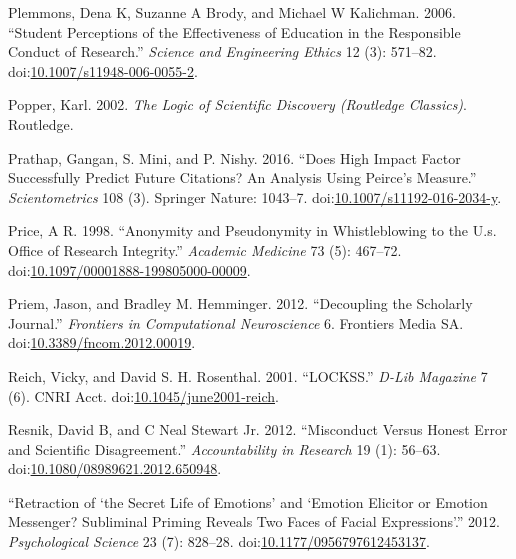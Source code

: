 \documentclass[a5paper]{book}
\begin{document}
\hypertarget{ref-doi:10.1007ux2fs11948-006-0055-2}{}
Plemmons, Dena K, Suzanne A Brody, and Michael W Kalichman. 2006.
``Student Perceptions of the Effectiveness of Education in the
Responsible Conduct of Research.'' \emph{Science and Engineering Ethics}
12 (3): 571--82.
doi:\href{https://doi.org/10.1007/s11948-006-0055-2}{10.1007/s11948-006-0055-2}.

\hypertarget{ref-isbn:9780415278430}{}
Popper, Karl. 2002. \emph{The Logic of Scientific Discovery (Routledge
Classics)}. Routledge.

\hypertarget{ref-doi:10.1007ux2fs11192-016-2034-y}{}
Prathap, Gangan, S. Mini, and P. Nishy. 2016. ``Does High Impact Factor
Successfully Predict Future Citations? An Analysis Using Peirce's
Measure.'' \emph{Scientometrics} 108 (3). Springer Nature: 1043--7.
doi:\href{https://doi.org/10.1007/s11192-016-2034-y}{10.1007/s11192-016-2034-y}.

\hypertarget{ref-doi:10.1097ux2f00001888-199805000-00009}{}
Price, A R. 1998. ``Anonymity and Pseudonymity in Whistleblowing to the
U.s. Office of Research Integrity.'' \emph{Academic Medicine} 73 (5):
467--72.
doi:\href{https://doi.org/10.1097/00001888-199805000-00009}{10.1097/00001888-199805000-00009}.

\hypertarget{ref-doi:10.3389ux2ffncom.2012.00019}{}
Priem, Jason, and Bradley M. Hemminger. 2012. ``Decoupling the Scholarly
Journal.'' \emph{Frontiers in Computational Neuroscience} 6. Frontiers
Media SA.
doi:\href{https://doi.org/10.3389/fncom.2012.00019}{10.3389/fncom.2012.00019}.

\hypertarget{ref-doi:10.1045ux2fjune2001-reich}{}
Reich, Vicky, and David S. H. Rosenthal. 2001. ``LOCKSS.'' \emph{D-Lib
Magazine} 7 (6). CNRI Acct.
doi:\href{https://doi.org/10.1045/june2001-reich}{10.1045/june2001-reich}.

\hypertarget{ref-doi:10.1080ux2f08989621.2012.650948}{}
Resnik, David B, and C Neal Stewart Jr. 2012. ``Misconduct Versus Honest
Error and Scientific Disagreement.'' \emph{Accountability in Research}
19 (1): 56--63.
doi:\href{https://doi.org/10.1080/08989621.2012.650948}{10.1080/08989621.2012.650948}.

\hypertarget{ref-doi:10.1177ux2f0956797612453137}{}
``Retraction of `the Secret Life of Emotions' and `Emotion Elicitor or
Emotion Messenger? Subliminal Priming Reveals Two Faces of Facial
Expressions'.'' 2012. \emph{Psychological Science} 23 (7): 828--28.
doi:\href{https://doi.org/10.1177/0956797612453137}{10.1177/0956797612453137}.
\end{document}
